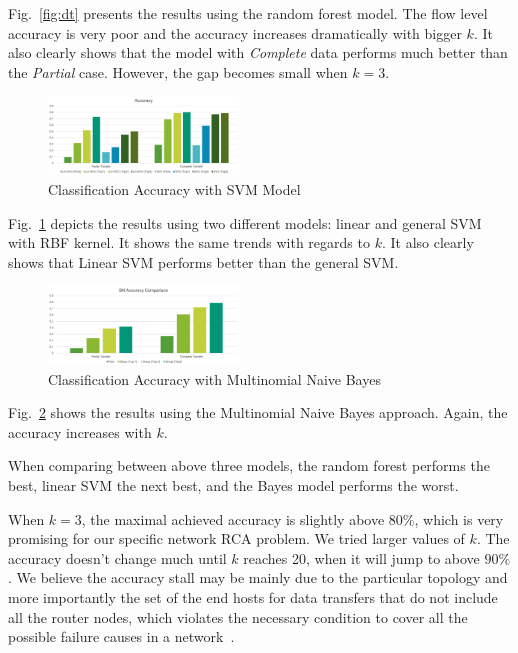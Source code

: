 Fig.~\ref{fig:dt} presents the results using the random forest model. The flow level accuracy is very poor and the accuracy increases dramatically with bigger $k$. It also clearly shows that the model with {\it Complete} data performs much better than the {\it Partial} case. However, the gap becomes small when $k=3$. 

\begin{figure}[!ht]
\begin{center}
\includegraphics[width=0.45\textwidth]{./figure/svm-result}
\end{center}
\caption{Classification Accuracy with SVM Model}
\label{fig:svm}
\end{figure}

Fig.~\ref{fig:svm} depicts the results using two different models: linear and general SVM with RBF kernel. It shows the same trends with regards to $k$. It also clearly shows that Linear SVM performs better than the general SVM.

\begin{figure}[!ht]
\begin{center}
\includegraphics[width=0.45\textwidth]{./figure/bn-result}
\end{center}
\caption{Classification Accuracy with Multinomial Naive Bayes}
\label{fig:bn}
\end{figure}

Fig.~\ref{fig:bn} shows the results using the Multinomial Naive Bayes approach. Again, the accuracy increases with $k$.

When comparing between above three models, the random forest performs the best, linear SVM the next best, and the Bayes model performs the worst. 

When $k=3$, the maximal achieved accuracy is slightly above $80\%$, which is very promising for our specific network RCA problem. We tried larger values of $k$. The accuracy doesn't change much until $k$ reaches 20, when it will jump to above $90\%$. We believe the accuracy stall may be mainly due to the particular topology and more importantly the set of the end hosts for data transfers that do not include all the router nodes, which violates the necessary condition to cover all the possible failure causes in a network~\cite{netbouncer:nsdi18}.  

